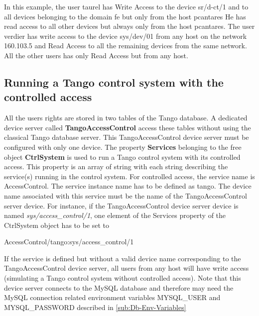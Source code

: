 In this example, the user \textquotedbl{}taurel\textquotedbl{} has
Write Access to the device \textquotedbl{}sr/d-ct/1\textquotedbl{}
and to all devices belonging to the domain \textquotedbl{}fe\textquotedbl{}
but only from the host \textquotedbl{}pcantares\textquotedbl{} He
has read access to all other devices but always only from the host
pcantares. The user \textquotedbl{}verdier\textquotedbl{} has write
access to the device \textquotedbl{}sys/dev/01\textquotedbl{} from
any host on the network \textquotedbl{}160.103.5\textquotedbl{} and
Read Access to all the remaining devices from the same network. All
the other users has only Read Access but from any host.


\subsection{Running a Tango control system with the controlled access}

All the users rights are stored in two tables of the Tango database.
A dedicated device server called \textbf{TangoAccessControl}
access these tables without using the classical Tango database server.
This TangoAccessControl device server must be configured with only
one device. The property \textbf{Services }belonging
to the free object\textbf{ CtrlSystem} is used
to run a Tango control system with its controlled access. This property
is an array of string with each string describing the service(s) running
in the control system. For controlled access, the service name is
\textquotedbl{}AccessControl\textquotedbl{}. The service instance
name has to be defined as \textquotedbl{}tango\textquotedbl{}. The
device name associated with this service must be the name of the TangoAccessControl
server device. For instance, if the TangoAccessControl device server
device is named \emph{sys/access\_control/1}, one element of the Services
property of the CtrlSystem object has to be set to\begin{center}AccessControl/tango:sys/access\_control/1\end{center}

If the service is defined but without a valid device name corresponding
to the TangoAccessControl device server, all users from any host will
have write access (simulating a Tango control system without controlled
access). Note that this device server connects to the MySQL database
and therefore may need the MySQL connection related environment variables
MYSQL\_USER and MYSQL\_PASSWORD
described in \ref{sub:Db-Env-Variables}

